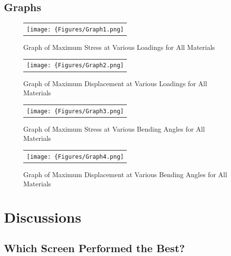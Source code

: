 \documentclass[a4paper,12pt]{article}
\numberwithin{equation}{section}
\numberwithin{figure}{section}
\begin{document}
\newpage
\subsection{Graphs}

\begin{figure}[H]
  \centering
  \begin{tabular}{@{}c@{}}
    \texttt{[image: \{Figures/Graph1.png]}} \\
  \end{tabular}
  \caption{Graph of Maximum Stress at Various Loadings for All Materials}
\end{figure}

\begin{figure}[H]
  \centering
  \begin{tabular}{@{}c@{}}
    \texttt{[image: \{Figures/Graph2.png]}} \\
  \end{tabular}
  \caption{Graph of Maximum Displacement at Various Loadings for All Materials}
\end{figure}

\begin{figure}[H]
  \centering
  \begin{tabular}{@{}c@{}}
    \texttt{[image: \{Figures/Graph3.png]}} \\
  \end{tabular}
  \caption{Graph of Maximum Stress at Various Bending Angles for All Materials}
\end{figure}

\begin{figure}[H]
  \centering
  \begin{tabular}{@{}c@{}}
    \texttt{[image: \{Figures/Graph4.png]}} \\
  \end{tabular}
  \caption{\centering Graph of Maximum Displacement at Various Bending Angles for All Materials}
\end{figure}

\newpage
\section{Discussions}

\subsection{Which Screen Performed the Best?}
\end{document}
